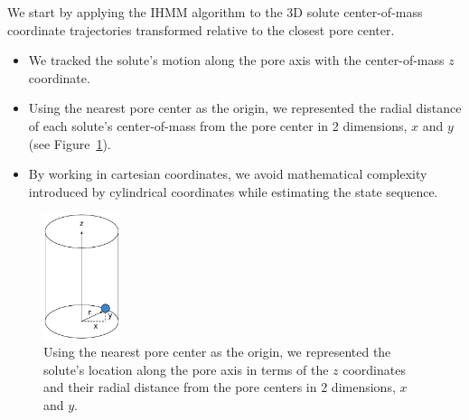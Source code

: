 \documentclass{article}
\begin{document}
  We start by applying the IHMM algorithm to the 3D solute center-of-mass coordinate 
  trajectories transformed relative to the closest pore center.
  \begin{itemize}
    \item We tracked the solute's motion along the pore axis with the center-of-mass
    $z$ coordinate.
    \item Using the nearest pore center as the origin, we represented the radial 
    distance of each solute's center-of-mass from the pore center in 2 dimensions,
    $x$ and $y$ (see Figure~\ref{fig:cartesian_cylinder}).
    \item By working in cartesian coordinates, we avoid mathematical complexity
    introduced by cylindrical coordinates while estimating the state sequence.
  \end{itemize}
  
  \begin{figure}
  \centering
  \includegraphics[width=0.2\textwidth]{cartesian_cylinder.pdf}
  \caption{Using the nearest pore center as the origin, we represented the solute's
  location along the pore axis in terms of the $z$ coordinates and their radial distance
  from the pore centers in 2 dimensions, $x$ and $y$.}\label{fig:cartesian_cylinder}
  \end{figure}
  
\end{document}
